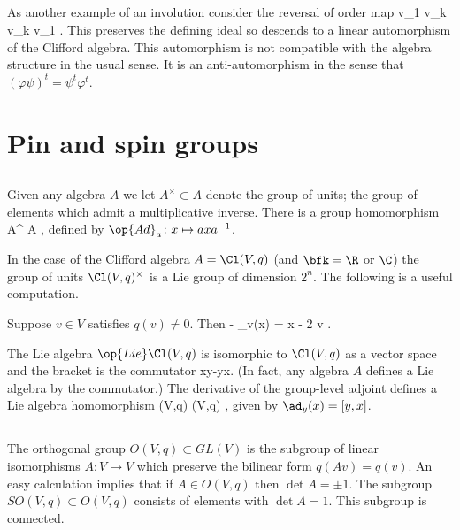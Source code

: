 \documentclass[../main.tex]{subfiles}
\begin{document}
\subsection{} 
As another example of an involution consider the reversal of order map
\beqn
v_1 \otimes \cdots \otimes v_k \mapsto v_k \otimes \cdots \otimes v_1 .
\eeqn
This preserves the defining ideal so descends to a linear automorphism of the Clifford algebra.
This automorphism is not compatible with the algebra structure in the usual sense.
It is an anti-automorphism in the sense that $(\varphi \psi)^t = \psi^t \varphi^t$.

\section{Pin and spin groups}

\subsection{}

Given any algebra $A$ we let $A^\times \subset A$ denote the group of units; the group of elements which admit a multiplicative inverse.
There is a group homomorphism
\beqn
{} \colon A^\times \hookrightarrow {} A ,
\eeqn
defined by $\op{Ad}_a \colon x\mapsto a x a^{-1}$.

In the case of the Clifford algebra $A = \Cl(V,q)$ (and $\bfk = \R$ or $\C$) the group of units $\Cl(V,q)^\times$ is a Lie group of dimension $2^n$.
The following is a useful computation.

\begin{prop}\label{prop:ad}
Suppose $v \in V$ satisfies $q(v) \ne 0$.
Then 
\beqn
- _v(x) = x - 2  v .
\eeqn
\end{prop}


The Lie algebra $\op{Lie} \Cl(V,q)$ is isomorphic to $\Cl(V,q)$ as a vector space and the bracket is the commutator
\beqn
[x,y]  xy-yx.
\eeqn
(In fact, any algebra $A$ defines a Lie algebra by the commutator.)
The derivative of the group-level adjoint defines a Lie algebra homomorphism
\beqn
{} \colon {} \Cl(V,q) \to {} \Cl(V,q) ,
\eeqn
given by $\ad_y (x) = [y,x]$.

\subsection{}

The orthogonal group $O(V,q) \subset GL(V)$ is the subgroup of linear isomorphisms $A \colon V \to V$ which preserve the bilinear form $q(Av) = q(v)$.
An easy calculation implies that if $A \in O(V,q)$ then $\det A = \pm 1$.
The subgroup $SO(V,q) \subset O(V,q)$ consists of elements with $\det A = 1$.
This subgroup is connected.
\end{document}
